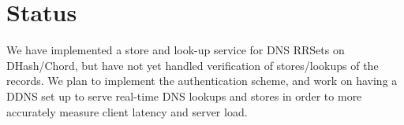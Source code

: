 \section{Status}

We have implemented a store and look-up service
for DNS RRSets on DHash/Chord,
but have not yet handled verification of stores/lookups 
of the records. We plan to implement the authentication
scheme, and work on having a DDNS set up to serve
real-time DNS lookups and stores in order to more 
accurately measure client latency and server load.



